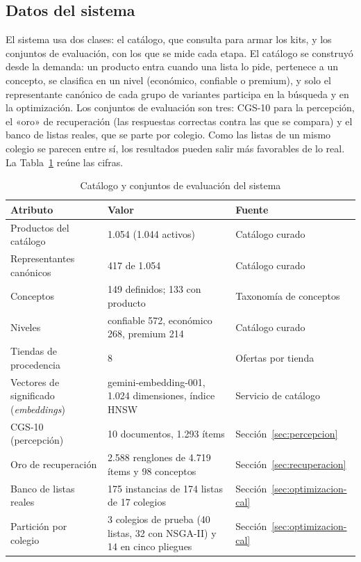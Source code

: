 \subsection{Datos del sistema}
\label{sec:datos-sistema}

El sistema usa dos clases: el catálogo, que consulta para armar los kits, y los conjuntos de evaluación, con los
que se mide cada etapa. El catálogo se construyó desde la demanda: un producto entra cuando una lista
lo pide, pertenece a un concepto, se clasifica en un nivel (económico, confiable o premium), y solo
el representante canónico de cada grupo de variantes participa en la búsqueda y en la optimización.
Los conjuntos de evaluación son tres: CGS-10 para la percepción, el «oro» de recuperación (las respuestas
correctas contra las que se compara) y el banco de listas reales, que se parte por colegio. Como las listas de un mismo
colegio se parecen entre sí, los resultados pueden salir más favorables de lo real. La
Tabla~\ref{tab:datos-sistema} reúne las cifras.

\begin{table}[htbp]
\centering
\caption{Catálogo y conjuntos de evaluación del sistema}
\label{tab:datos-sistema}
\small
\begin{tabularx}{\linewidth}{@{}p{3.6cm}p{4.4cm}X@{}}
\toprule
\textbf{Atributo} & \textbf{Valor} & \textbf{Fuente} \\
\midrule
Productos del catálogo & 1.054 (1.044 activos) & Catálogo curado \\
Representantes canónicos & 417 de 1.054 & Catálogo curado \\
Conceptos & 149 definidos; 133 con producto & Taxonomía de conceptos \\
Niveles & confiable 572, económico 268, premium 214 & Catálogo curado \\
Tiendas de procedencia & 8 & Ofertas por tienda \\
Vectores de significado (\emph{embeddings}) & gemini-embedding-001, 1.024 dimensiones, índice HNSW & Servicio de catálogo \\
CGS-10 (percepción) & 10 documentos, 1.293 ítems & Sección~\ref{sec:percepcion} \\
Oro de recuperación & 2.588 renglones de 4.719 ítems y 98 conceptos & Sección~\ref{sec:recuperacion} \\
Banco de listas reales & 175 instancias de 174 listas de 17 colegios & Sección~\ref{sec:optimizacion-cal} \\
Partición por colegio & 3 colegios de prueba (40 listas, 32 con NSGA-II) y 14 en cinco pliegues & Sección~\ref{sec:optimizacion-cal} \\
\bottomrule
\end{tabularx}
\end{table}


